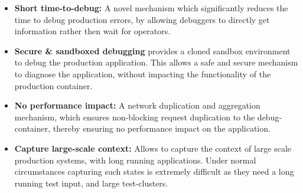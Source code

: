 \begin{itemize}[leftmargin=*,topsep=0pt,itemsep=-1ex,partopsep=1ex,parsep=1ex]
\item \textbf{Short time-to-debug:} A novel mechanism which significantly reduces the time to debug production errors, by allowing debuggers to directly get information rather then wait for operators. 
\item \textbf{Secure \& sandboxed debugging} \parikshan provides a cloned sandbox environment to debug the production application.
This allows a safe and secure mechanism to diagnose the application, without impacting the functionality of the production container.
\item \textbf{No performance impact:} A network duplication and aggregation mechanism, which ensures non-blocking request duplication to the debug-container, thereby ensuring no performance impact on the application. 
\item \textbf{Capture large-scale context:} Allows to capture the context of large scale production systems, with long running applications. Under normal circumstances capturing such states is extremely difficult as they need a long running test input, and large test-clusters.


\end{itemize}



